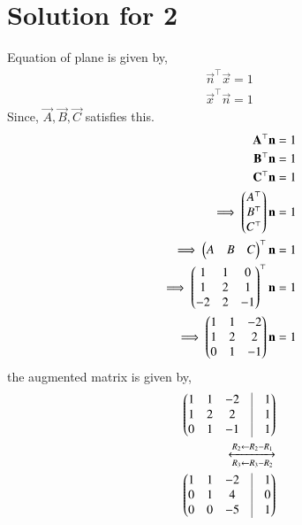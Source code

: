 \documentclass[A4,10pt,twocolumn]{IEEEtran}
\begin{document}
\section{Solution for 2}
Equation of plane is given by,
\begin{align}
\vec{n}^\top \vec{x} = 1\\
\vec{x}^\top \vec{n}=1
\end{align}
Since, $\vec{A}, \vec{B}, \vec{C}$ satisfies this.
\begin{align}
\mathbf{A}^\top \mathbf{n}=1\\
  \mathbf{B}^\top \mathbf{n}=1\\
 \mathbf{C}^\top \mathbf{n}=1\\
\implies \begin{pmatrix}A^\top\\B^\top\\C^\top\end{pmatrix}  \mathbf{n} = 1\\
\implies \begin{pmatrix}A&B&C\end{pmatrix}^\top\mathbf{n}=1\\
\implies \begin{pmatrix}1&1&0 \\ 1&2&1 \\ -2&2&-1\end{pmatrix} ^\top \mathbf{n}=1\\
\implies \begin{pmatrix}1&1&-2\\1&2&2\\0&1&-1\end{pmatrix}\mathbf{n}=1
\end{align}
the augmented matrix is given by,
\begin{align}
\myvec{1&1&-2&\vrule&1\\1&2&2&\vrule&1\\0&1&-1&\vrule&1}\\
\xleftrightarrow[R_3 \leftarrow R_3 - R_2]{R_2 \leftarrow R_2 - R_1}\\
\myvec{1&1&-2&\vrule&1\\0&1&4&\vrule&0\\0&0&-5&\vrule&1}
\end{align}
\end{document}
